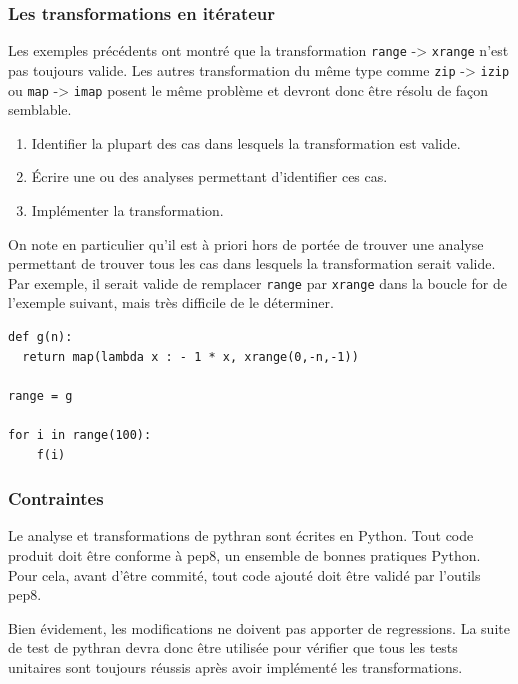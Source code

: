 \documentclass[a4paper]{article}
\begin{document}
\subsubsection{Les transformations en itérateur}

Les exemples précédents ont montré que la transformation
\texttt{range} -> \texttt{xrange} n'est pas toujours valide. Les
autres transformation du même type comme \texttt{zip} -> \texttt{izip}
ou \texttt{map} -> \texttt{imap} posent le même problème et devront
donc être résolu de façon semblable.

\begin{enumerate}
\item Identifier la plupart des cas dans lesquels la transformation
  est valide.
\item Écrire une ou des analyses permettant d'identifier ces cas.
\item Implémenter la transformation.
\end{enumerate}

On note en particulier qu'il est à priori hors de portée de trouver
une analyse permettant de trouver tous les cas dans lesquels la
transformation serait valide. Par exemple, il serait valide de
remplacer \texttt{range} par \texttt{xrange} dans la boucle for de
l'exemple suivant, mais très difficile de le déterminer.


\begin{lstlisting}
def g(n):
  return map(lambda x : - 1 * x, xrange(0,-n,-1))

range = g

for i in range(100):
    f(i)
\end{lstlisting}

\subsubsection{Contraintes}

Le analyse et transformations de pythran sont écrites en Python. Tout
code produit doit être conforme à pep8, un ensemble de bonnes
pratiques Python. Pour cela, avant d'être commité, tout code ajouté
doit être validé par l'outils pep8. 

Bien évidement, les modifications ne doivent pas apporter de
regressions. La suite de test de pythran devra donc être utilisée pour
vérifier que tous les tests unitaires sont toujours réussis après
avoir implémenté les transformations.

\clearpage

\appendix


\listoffigures            



\end{document}
